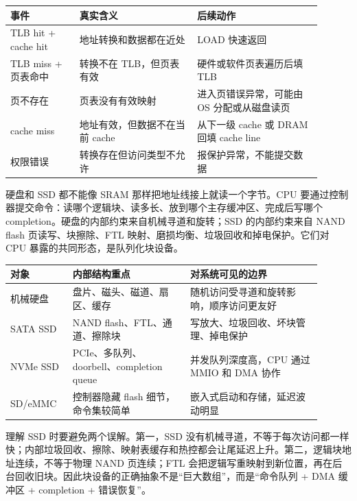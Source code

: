\begin{longtable}{L{0.2\linewidth}L{0.34\linewidth}L{0.36\linewidth}}
\toprule
事件 & 真实含义 & 后续动作 \\
\midrule
TLB hit + cache hit & 地址转换和数据都在近处 & LOAD 快速返回 \\
TLB miss + 页表命中 & 转换不在 TLB，但页表有效 & 硬件或软件页表遍历后填 TLB \\
页不存在 & 页表没有有效映射 & 进入页错误异常，可能由 OS 分配或从磁盘读页 \\
cache miss & 地址有效，但数据不在当前 cache & 从下一级 cache 或 DRAM 回填 cache line \\
权限错误 & 转换存在但访问类型不允许 & 报保护异常，不能提交数据 \\
\bottomrule
\end{longtable}

硬盘和 SSD 都不能像 SRAM 那样把地址线接上就读一个字节。CPU 要通过控制器提交命令：读哪个逻辑块、读多长、放到哪个主存缓冲区、完成后写哪个 completion。硬盘的内部约束来自机械寻道和旋转；SSD 的内部约束来自 NAND flash 页读写、块擦除、FTL 映射、磨损均衡、垃圾回收和掉电保护。它们对 CPU 暴露的共同形态，是队列化块设备。

\begin{longtable}{L{0.18\linewidth}L{0.34\linewidth}L{0.38\linewidth}}
\toprule
对象 & 内部结构重点 & 对系统可见的边界 \\
\midrule
机械硬盘 & 盘片、磁头、磁道、扇区、缓存 & 随机访问受寻道和旋转影响，顺序访问更友好 \\
SATA SSD & NAND flash、FTL、通道、擦除块 & 写放大、垃圾回收、坏块管理、掉电保护 \\
NVMe SSD & PCIe、多队列、doorbell、completion queue & 并发队列深度高，CPU 通过 MMIO 和 DMA 协作 \\
SD/eMMC & 控制器隐藏 flash 细节，命令集较简单 & 嵌入式启动和存储，延迟波动明显 \\
\bottomrule
\end{longtable}

理解 SSD 时要避免两个误解。第一，SSD 没有机械寻道，不等于每次访问都一样快；内部垃圾回收、擦除、映射表缓存和热控都会让尾延迟上升。第二，逻辑块地址连续，不等于物理 NAND 页连续；FTL 会把逻辑写重映射到新位置，再在后台回收旧块。因此块设备的正确抽象不是“巨大数组”，而是“命令队列 + DMA 缓冲区 + completion + 错误恢复”。

